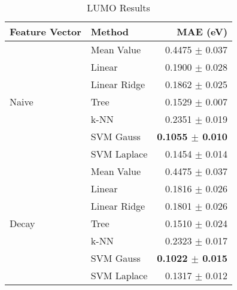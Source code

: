 \documentclass[10pt]{article}
\begin{document}


\begin{table}[H]
  \centering
  \caption{LUMO Results}
  \begin{tabular}{llr}
            Feature Vector     & Method       & MAE (eV)                \\
    \hline\hline
    \multirow{7}{*}{Naive}     & Mean Value   & 0.4475 $\pm$ 0.037 \\
                               & Linear       & 0.1900 $\pm$ 0.028 \\
                               & Linear Ridge & 0.1862 $\pm$ 0.025 \\
                               & Tree         & 0.1529 $\pm$ 0.007 \\
                               & k-NN         & 0.2351 $\pm$ 0.019 \\
                               & SVM Gauss    & \textbf{0.1055 $\pm$ 0.010} \\
                               & SVM Laplace  & 0.1454 $\pm$ 0.014 \\
    \hline
    \multirow{7}{*}{Decay}     & Mean Value   & 0.4475 $\pm$ 0.037 \\
                               & Linear       & 0.1816 $\pm$ 0.026 \\
                               & Linear Ridge & 0.1801 $\pm$ 0.026 \\
                               & Tree         & 0.1510 $\pm$ 0.024 \\
                               & k-NN         & 0.2323 $\pm$ 0.017 \\
                               & SVM Gauss    & \textbf{0.1022 $\pm$ 0.015} \\
                               & SVM Laplace  & 0.1317 $\pm$ 0.012 \\

\end{tabular}
\end{table}
\end{document}
